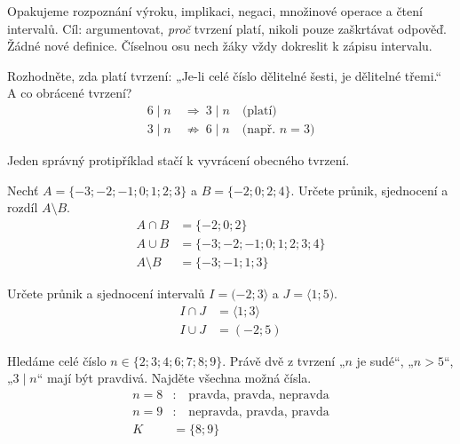 \documentclass[11pt,a4paper]{article}
\begin{document}
Opakujeme rozpoznání výroku, implikaci, negaci, množinové operace a čtení intervalů. Cíl: argumentovat, \emph{proč} tvrzení platí, nikoli pouze zaškrtávat odpověď. Žádné nové definice. Číselnou osu nech žáky vždy dokreslit k zápisu intervalu.
\begin{prikladReseniBox}[title={Příklad 1}]
Rozhodněte, zda platí tvrzení: „Je-li celé číslo dělitelné šesti, je dělitelné třemi.“ A co obrácené tvrzení?
\tcblower
\[
\begin{aligned}
6\mid n&\ \Rightarrow\ 3\mid n\quad\text{(platí)}\\
3\mid n&\ \not\Rightarrow\ 6\mid n\quad\text{(např. }n=3\text{)}
\end{aligned}
\]

Jeden správný protipříklad stačí k vyvrácení obecného tvrzení.
\end{prikladReseniBox}
\begin{prikladReseniBox}[title={Příklad 2}]
Nechť $A=\{-3;-2;-1;0;1;2;3\}$ a $B=\{-2;0;2;4\}$. Určete průnik, sjednocení a rozdíl $A\setminus B$.
\tcblower
\[
\begin{aligned}
A\cap B&=\{-2;0;2\}\\
A\cup B&=\{-3;-2;-1;0;1;2;3;4\}\\
A\setminus B&=\{-3;-1;1;3\}
\end{aligned}
\]

\end{prikladReseniBox}
\begin{prikladReseniBox}[title={Příklad 3}]
Určete průnik a sjednocení intervalů $I=(-2;3\rangle$ a $J=\langle1;5)$.
\tcblower
\[
\begin{aligned}
I\cap J&=\langle1;3\rangle\\
I\cup J&=(-2;5)
\end{aligned}
\]

\end{prikladReseniBox}
\begin{prikladReseniBox}[title={Příklad 4}]
Hledáme celé číslo $n\in\{2;3;4;6;7;8;9\}$. Právě dvě z tvrzení „$n$ je sudé“, „$n>5$“, „$3\mid n$“ mají být pravdivá. Najděte všechna možná čísla.
\tcblower
\[
\begin{aligned}
n=8&:\quad\text{pravda, pravda, nepravda}\\
n=9&:\quad\text{nepravda, pravda, pravda}\\
K&=\{8;9\}
\end{aligned}
\]

\end{prikladReseniBox}
\end{document}
